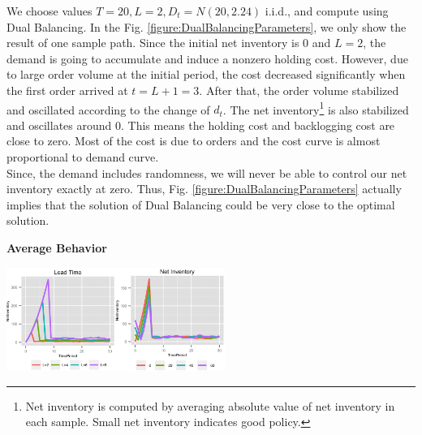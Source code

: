 \documentclass[twoside]{article}
\begin{document}
\begin{multicols}{2}
We choose values $T=20,L=2,D_t=N(20,2.24)$ i.i.d., and compute using Dual Balancing. In the Fig. \ref{figure:DualBalancingParameters}, we only show the result of one sample path. Since the initial net inventory is $0$ and $L=2$, the demand is going to accumulate and induce a nonzero holding cost. However, due to large order volume at the initial period, the cost decreased significantly when the first order arrived at $t=L+1=3$. After that, the order volume stabilized and oscillated according to the change of $d_t$. The net inventory\footnote{Net inventory is computed by averaging absolute value of net inventory in each sample. Small net inventory indicates good policy.} is also stabilized and oscillates around $0$. This means the holding cost and backlogging cost are close to zero. Most of the cost is due to orders and the cost curve is almost proportional to demand curve.\\
Since, the demand includes randomness, we will never be able to control our net inventory exactly at zero. Thus, Fig. \ref{figure:DualBalancingParameters} actually implies that the solution of Dual Balancing could be very close to the optimal solution.
\begin{center}
  \textbf{Average Behavior}
\end{center}

\begin{center}
  \label{figure:NetInventoryLeadTime}
  \includegraphics[width=2.8in]{figures/NetInventoryLeadTime.png}
\end{center}


\end{multicols}
\end{document}
